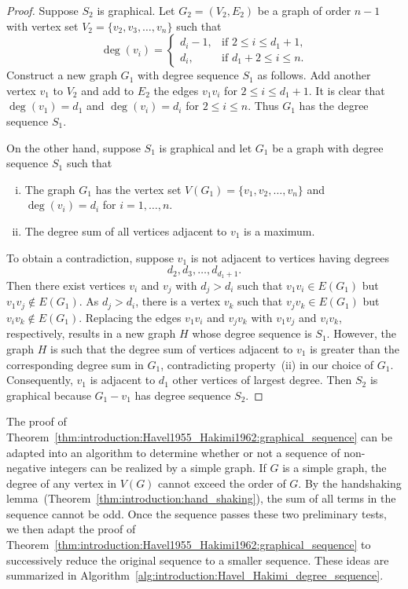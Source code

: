 \begin{proof}
Suppose $S_2$ is graphical. Let $G_2 = (V_2, E_2)$ be a graph of order
$n - 1$ with vertex set $V_2 = \{v_2, v_3, \dots, v_n\}$ such that
\[
\deg(v_i)
=
\begin{cases}
d_i - 1, & \text{if $2 \leq i \leq d_1 + 1$,} \\
d_i,     & \text{if $d_1 + 2 \leq i \leq n$.}
\end{cases}
\]
Construct a new graph $G_1$ with degree sequence $S_1$ as follows. Add
another vertex $v_1$ to $V_2$ and add to $E_2$ the edges $v_1 v_i$ for
$2 \leq i \leq d_1 + 1$. It is clear that $\deg(v_1) = d_1$ and
$\deg(v_i) = d_i$ for $2 \leq i \leq n$. Thus $G_1$ has the degree
sequence $S_1$.

On the other hand, suppose $S_1$ is graphical and let $G_1$ be a graph
with degree sequence $S_1$ such that
%
\begin{enumerate}[(i)]
\item The graph $G_1$ has the vertex set
  $V(G_1) = \{v_1, v_2, \dots, v_n\}$ and $\deg(v_i) = d_i$ for
  $i = 1, \dots, n$.

\item The degree sum of all vertices adjacent to $v_1$ is a maximum.
\end{enumerate}
%
To obtain a contradiction, suppose $v_1$ is not adjacent to vertices
having degrees
\[
d_2, d_3, \dots, d_{d_1 + 1}.
\]
Then there exist vertices $v_i$ and $v_j$ with $d_j > d_i$ such that
$v_1 v_i \in E(G_1)$ but $v_1 v_j \not\in E(G_1)$. As $d_j > d_i$,
there is a vertex $v_k$ such that $v_j v_k \in E(G_1)$ but
$v_i v_k \not\in E(G_1)$. Replacing the edges $v_1 v_i$ and $v_j v_k$
with $v_1 v_j$ and $v_i v_k$, respectively, results in a new graph $H$
whose degree sequence is $S_1$. However, the graph $H$ is such that
the degree sum of vertices adjacent to $v_1$ is greater than the
corresponding degree sum in $G_1$, contradicting property~(ii) in our
choice of $G_1$. Consequently, $v_1$ is adjacent to $d_1$ other
vertices of largest degree. Then $S_2$ is graphical because
$G_1 - v_1$ has degree sequence $S_2$.
\end{proof}

The proof of
Theorem~\ref{thm:introduction:Havel1955_Hakimi1962:graphical_sequence}
can be adapted into an algorithm to determine whether or not a
sequence of non-negative integers can be realized by a simple
graph. If $G$ is a simple graph, the degree of any vertex in $V(G)$
cannot exceed the order of $G$. By the handshaking
lemma~(Theorem~\ref{thm:introduction:hand_shaking}), the sum of all
terms in the sequence cannot be odd. Once the sequence passes these
two preliminary tests, we then adapt the proof of
Theorem~\ref{thm:introduction:Havel1955_Hakimi1962:graphical_sequence}
to successively reduce the original sequence to a smaller
sequence. These ideas are summarized in
Algorithm~\ref{alg:introduction:Havel_Hakimi_degree_sequence}.

